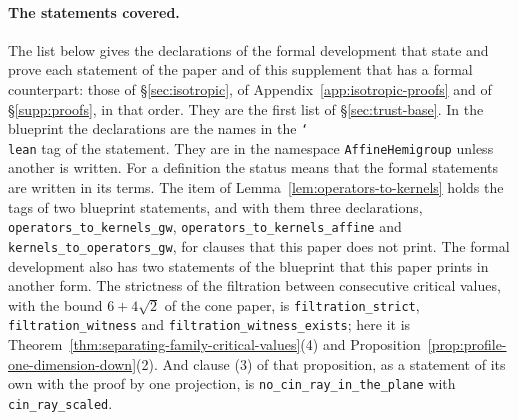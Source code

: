 \paragraph{The statements covered.} The list below gives the declarations of the formal
development that state and prove each statement of the paper and of this supplement that has
a formal counterpart: those of \S\ref{sec:isotropic}, of Appendix~\ref{app:isotropic-proofs}
and of \S\ref{supp:proofs}, in that order. They are the first list of \S\ref{sec:trust-base}.
In the blueprint the declarations are the
names in the \texttt{\char`\\lean} tag of the statement. They are in the namespace
\texttt{AffineHemigroup} unless another is written. For a definition the status means that the
formal statements are written in its terms. The item of Lemma~\ref{lem:operators-to-kernels}
holds the tags of two blueprint statements, and with them three declarations,
\texttt{operators\_to\_kernels\_gw}, \texttt{operators\_to\_kernels\_affine} and
\texttt{kernels\_to\_operators\_gw}, for clauses that this paper does not print. The formal
development also has two statements of the blueprint that this paper prints in another form.
The strictness of the filtration between consecutive critical values, with the bound
$6 + 4\sqrt2$ of the cone paper, is \texttt{filtration\_strict}, \texttt{filtration\_witness}
and \texttt{filtration\_witness\_exists}; here it is
Theorem~\ref{thm:separating-family-critical-values}(4) and
Proposition~\ref{prop:profile-one-dimension-down}(2). And clause (3) of that proposition, as a
statement of its own with the proof by one projection, is
\texttt{no\_cin\_ray\_in\_the\_plane} with \texttt{cin\_ray\_scaled}.
